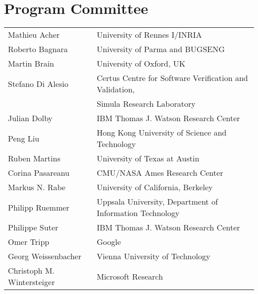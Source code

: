 \section*{Program Committee}
\noindent
\begin{longtable}{p{}p{}}
Mathieu Acher & University of Rennes I/INRIA\\
Roberto Bagnara & University of Parma and BUGSENG\\
Martin Brain & University of Oxford, UK\\
Stefano Di Alesio & Certus Centre for Software Verification and Validation,\\ 
  & Simula Research Laboratory\\
Julian Dolby & IBM Thomas J. Watson Research Center\\
Peng Liu & Hong Kong University of Science and Technology\\
Ruben Martins & University of Texas at Austin\\
Corina Pasareanu & CMU/NASA Ames Research Center\\
Markus N. Rabe & University of California, Berkeley\\
Philipp Ruemmer & Uppsala University, Department of Information Technology\\
Philippe Suter & IBM Thomas J. Watson Research Center\\
Omer Tripp & Google\\
Georg Weissenbacher & Vienna University of Technology\\
Christoph M. Wintersteiger & Microsoft Research\\
\end{longtable}

\clearpage
